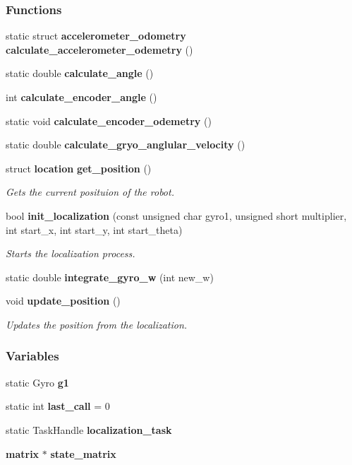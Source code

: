 \subsubsection*{Functions}
\begin{DoxyCompactItemize}
\item 
static struct \textbf{ accelerometer\+\_\+odometry} \textbf{ calculate\+\_\+accelerometer\+\_\+odemetry} ()
\item 
static double \textbf{ calculate\+\_\+angle} ()
\item 
int \textbf{ calculate\+\_\+encoder\+\_\+angle} ()
\item 
static void \textbf{ calculate\+\_\+encoder\+\_\+odemetry} ()
\item 
static double \textbf{ calculate\+\_\+gryo\+\_\+anglular\+\_\+velocity} ()
\item 
struct \textbf{ location} \textbf{ get\+\_\+position} ()
\begin{DoxyCompactList}\small\item\em Gets the current posituion of the robot. \end{DoxyCompactList}\item 
bool \textbf{ init\+\_\+localization} (const unsigned char gyro1, unsigned short multiplier, int start\+\_\+x, int start\+\_\+y, int start\+\_\+theta)
\begin{DoxyCompactList}\small\item\em Starts the localization process. \end{DoxyCompactList}\item 
static double \textbf{ integrate\+\_\+gyro\+\_\+w} (int new\+\_\+w)
\item 
void \textbf{ update\+\_\+position} ()
\begin{DoxyCompactList}\small\item\em Updates the position from the localization. \end{DoxyCompactList}\end{DoxyCompactItemize}
\subsubsection*{Variables}
\begin{DoxyCompactItemize}
\item 
static Gyro \textbf{ g1}
\item 
static int \textbf{ last\+\_\+call} = 0
\item 
static Task\+Handle \textbf{ localization\+\_\+task}
\item 
\textbf{ matrix} $\ast$ \textbf{ state\+\_\+matrix}
\end{DoxyCompactItemize}


